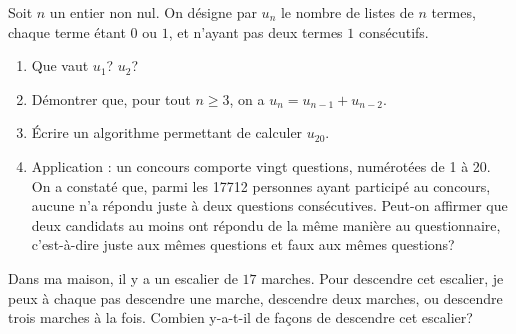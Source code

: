 \documentclass[../PolyS4.tex]{subfiles}
\begin{document}



Soit $n$ un entier non nul. On désigne par $u_n$ le nombre de listes de $n$ termes, chaque terme étant $0$ ou $1$, et n'ayant pas deux termes $1$ consécutifs.
\begin{enumerate}
\item Que vaut $u_1$? $u_2$?
\item Démontrer que, pour tout $n\geq 3$, on a $u_n=u_{n-1}+u_{n-2}$.
\item \'Ecrire un algorithme permettant de calculer $u_{20}$.
\item Application : un concours comporte vingt questions, numérotées de 1 à 20. On a constaté que, parmi les 17712 personnes ayant participé au concours, aucune n'a répondu juste à deux questions consécutives. Peut-on affirmer que deux candidats au moins ont répondu de la même manière au questionnaire, c'est-à-dire juste aux mêmes questions et faux aux mêmes questions?\\
\end{enumerate}





Dans ma maison, il y a un escalier de $17$ marches. Pour descendre cet escalier, je peux à chaque pas descendre une marche, descendre deux marches, ou descendre trois marches à la fois. Combien y-a-t-il de façons de descendre cet escalier?\\




\end{document}
